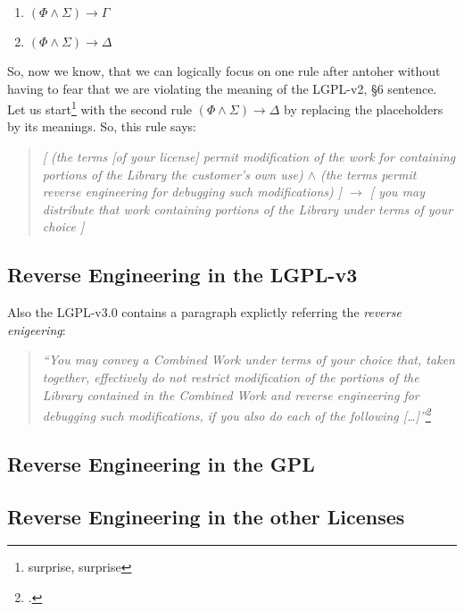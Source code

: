 \begin{enumerate}
\item $(\Phi \wedge \Sigma) \rightarrow \Gamma$
\item $(\Phi \wedge \Sigma) \rightarrow \Delta$
\end{enumerate}

So, now we know, that we can logically focus on one rule after antoher without
having to fear that we are violating the meaning of the LGPL-v2, §6 sentence.
Let us start\footnote{surprise, surprise} with the second rule $(\Phi
\wedge \Sigma) \rightarrow \Delta$ by replacing the placeholders by its
meanings. So, this rule says:

\begin{quote}\noindent\emph{ [ (the terms [of your license] permit
modification of the work for containing portions of the Library the customer's
own use) $\wedge$ (the terms permit reverse engineering for debugging such
  modifications) ] $\rightarrow$ [ you may distribute that work containing
  portions of the Library under terms of your choice ]
}
\end{quote}



\subsection{Reverse Engineering in the LGPL-v3}
Also the LGPL-v3.0 contains a paragraph explictly referring the \emph{reverse
enigeering}:


\begin{quote}\emph{
\enquote{You may convey a Combined Work under terms of your choice that,
taken together, effectively \emph{do not restrict} modification of the portions
of the Library contained in the Combined Work and \emph{reverse engineering} for
debugging such modifications, if you also do each of the following
[\ldots]}\footcite[cf.][\nopage wp]{Lgpl30OsiLicense2007a}}
\end{quote}


\subsection{Reverse Engineering in the GPL}

\subsection{Reverse Engineering in the other Licenses}





